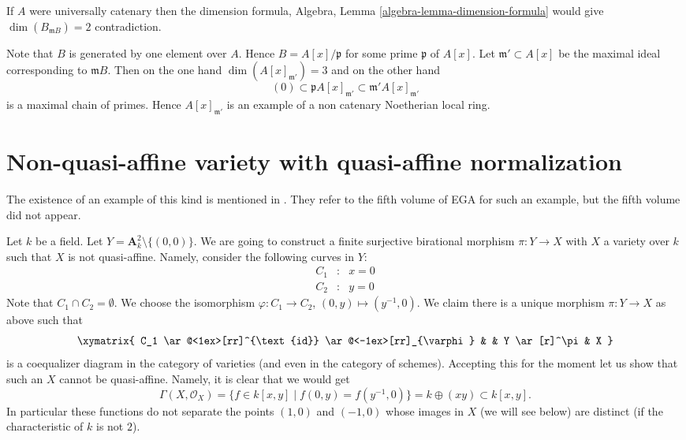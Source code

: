 \medskip\noindent
If $A$ were universally catenary then the dimension formula,
Algebra, Lemma \ref{algebra-lemma-dimension-formula}
would give $\dim(B_{\mathfrak mB}) = 2$ contradiction.

\medskip\noindent
Note that $B$ is generated by one element over $A$.
Hence $B = A[x]/\mathfrak p$ for some prime
$\mathfrak p$ of $A[x]$. Let $\mathfrak m' \subset A[x]$ be
the maximal ideal corresponding to $\mathfrak mB$. Then on
the one hand $\dim(A[x]_{\mathfrak m'}) = 3$ and on the
other hand
$$
(0)
\subset \mathfrak pA[x]_{\mathfrak m'}
\subset \mathfrak m'A[x]_{\mathfrak m'}
$$
is a maximal chain of primes. Hence $A[x]_{\mathfrak m'}$ is
an example of a non catenary Noetherian local ring.




\section{Non-quasi-affine variety with quasi-affine normalization}
\label{section-nonquasi-affine}

\noindent
The existence of an example of this kind is mentioned in
\cite[II Remark 6.6.13]{EGA}. They refer to the fifth volume of
EGA for such an example, but the fifth volume did not appear.

\medskip\noindent
Let $k$ be a field.
Let $Y = \mathbf{A}^2_k \setminus \{(0, 0)\}$.
We are going to construct a finite surjective birational morphism
$\pi : Y \longrightarrow X$
with $X$ a variety over $k$ such that $X$ is not quasi-affine.
Namely, consider the following curves in $Y$:
$$
\begin{matrix}
C_1 & : & x = 0 \\
C_2 & : & y = 0
\end{matrix}
$$
Note that $C_1 \cap C_2 = \emptyset$. We choose the isomorphism
$\varphi : C_1 \to C_2$, $(0, y) \mapsto (y^{-1}, 0)$.
We claim there is a unique morphism $\pi : Y \to X$ as above
such that
$$
\xymatrix{
C_1
\ar@<1ex>[rr]^{\text{id}} \ar@<-1ex>[rr]_{\varphi}
& &
Y \ar[r]^\pi & X
}
$$
is a coequalizer diagram in the category of varieties (and even in
the category of schemes). Accepting this for the moment let us
show that such an $X$ cannot be quasi-affine. Namely, it is clear
that we would get
$$
\Gamma(X, \mathcal{O}_X) =
\{ f \in k[x, y] \mid f(0, y) = f(y^{-1}, 0)\} =
k \oplus (xy) \subset k[x, y].
$$
In particular these functions do not separate the points $(1, 0)$
and $(-1, 0)$ whose images in $X$ (we will see below) are distinct
(if the characteristic of $k$ is not $2$).

